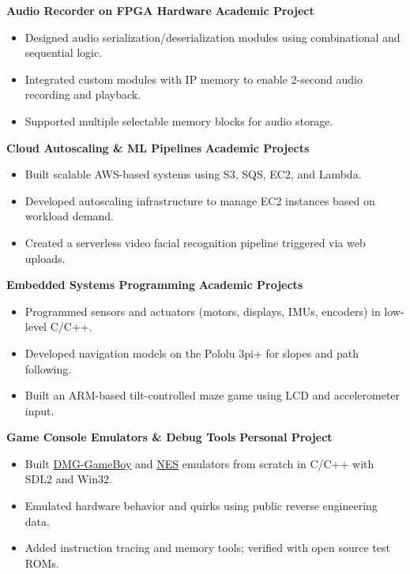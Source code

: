 \textbf{Audio Recorder on FPGA Hardware} \hfill \textbf{Academic Project}
\begin{itemize}
    \item Designed audio serialization/deserialization modules using combinational and sequential logic.
    \item Integrated custom modules with IP memory to enable 2-second audio recording and playback.
    \item Supported multiple selectable memory blocks for audio storage.
\end{itemize}

\textbf{Cloud Autoscaling \& ML Pipelines} \hfill \textbf{Academic Projects}
\begin{itemize}
    \item Built scalable AWS-based systems using S3, SQS, EC2, and Lambda.
    \item Developed autoscaling infrastructure to manage EC2 instances based on workload demand.
    \item Created a serverless video facial recognition pipeline triggered via web uploads.
\end{itemize}

\textbf{Embedded Systems Programming} \hfill \textbf{Academic Projects}
\begin{itemize}
    \item Programmed sensors and actuators (motors, displays, IMUs, encoders) in low-level C/C++.
    \item Developed navigation models on the Pololu 3pi+ for slopes and path following.
    \item Built an ARM-based tilt-controlled maze game using LCD and accelerometer input.
\end{itemize}

\textbf{Game Console Emulators \& Debug Tools} \hfill \textbf{Personal Project}
\begin{itemize}
    \item Built \href{https://github.com/alexsutila/gbemulator}{DMG-GameBoy} and \href{https://github.com/alexsutila/nesemulator}{NES} emulators from scratch in C/C++ with SDL2 and Win32.
    \item Emulated hardware behavior and quirks using public reverse engineering data.
    \item Added instruction tracing and memory tools; verified with open source test ROMs.
\end{itemize}
